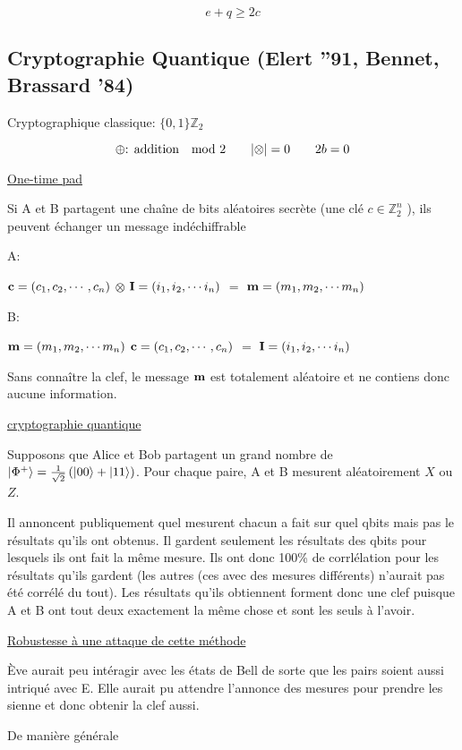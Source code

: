 $$\boxed{e + q \geq 2c}$$ 

\subsection{Cryptographie Quantique (Elert ''91, Bennet, Brassard '84)}

Cryptographique classique: $\{ 0,1 \} \mathbb{Z}_2$ 

$$\oplus \text{: addition }\mod 2 \qquad \abs{\otimes}=0 \qquad 2b = 0$$ 

\underline{One-time pad} 

Si A et B partagent une chaîne de bits aléatoires secrète (une clé $c \in \mathbb{Z}_2^n $ ), ils peuvent échanger un message indéchiffrable 

A:

$\vb{c}= (c_1 , c_2 , \dotsb , c_n )$ $\otimes$ $\vb{I} = (i_1 , i_{2}, \dotsb i_n )$ $=$ $\vb{m}=(m_1 , m_2 , \dotsb m_n )$ 


B:

$\vb{m}=(m_1 , m_2 , \dotsb m_n )$ 
\otimes 
$\vb{c}= (c_1 , c_2 , \dotsb , c_n )$ 
$=$
$\vb{I} = (i_1 , i_{2}, \dotsb i_n )$

Sans connaître la clef, le message $\vb{m}$ est totalement aléatoire et ne contiens donc aucune information.


\underline{cryptographie quantique}

Supposons que Alice et Bob partagent un grand nombre de $\ket{\Phi^+} = \frac{1}{\sqrt{2}} \left( \ket{00} + \ket{11} \right) $. Pour chaque paire, A et B mesurent aléatoirement $X$ ou $Z$.

Il annoncent publiquement quel mesurent chacun a fait sur quel qbits mais pas le résultats qu'ils ont obtenus. Il gardent seulement les résultats des qbits pour lesquels ils ont fait la même mesure. Ils ont donc 100\% de corrlélation pour les résultats qu'ils gardent (les autres (ces avec des mesures différents) n'aurait pas été corrélé du tout). Les résultats qu'ils obtiennent forment donc une clef puisque A et B ont tout deux exactement la même chose et sont les seuls à l'avoir.


\underline{Robustesse à une attaque de cette méthode}

Ève aurait peu intéragir avec les états de Bell de sorte que les pairs soient aussi intriqué avec E. Elle aurait pu attendre l'annonce des mesures pour prendre les sienne et donc obtenir la clef aussi.

De manière générale 

